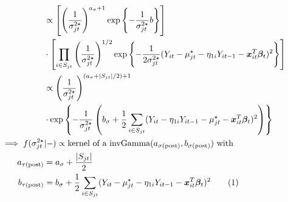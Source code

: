\documentclass[12pt,	%
	a4paper,		%
	twoside,		%
	openright,		%
	titlepage,%
	]{book}
\theoremstyle{definition}
\begin{document}
\begin{itemize}
\begin{align*}
& \propto \left[ \left( \frac{1}{\sigma^{2\star}_{jt}}\right)^{a_\sigma+1} \expp{-\frac{1}{\sigma^{2\star}_{jt}}b} \right] \\ & \cdot\left[  \prod_{i \in S_{jt}} 
\left( \frac{1}{\sigma^{2\star}_{jt}}\right)^{1/2} \expp{-\frac{1}{2\sigma^{2\star}_{jt}}(Y_{it}-\mu^\star_{jt}-\eta_{1i}Y_{it-1}-\vec{x}_{it}^T\vec{\beta}_t)^2} \right]\\
& \propto \left( \frac{1}{\sigma^{2\star}_{jt}}\right)^{(a_\sigma + |S_{jt}|/2)+1} \\ &\cdot \expp{-\frac{1}{\sigma^{2\star}_{jt}}\left( b_\sigma + \frac{1}{2}\sum_{i \in S_{jt}}(Y_{it}-\eta_{1i}Y_{it-1}-\mu^\star_{jt}-\vec{x}_{it}^T\vec{\beta}_t)^2 \right)}\\ 
%
 \implies f(\sigma^{2\star}_{jt}&|-) \propto \text{kernel of a $\invgamma(a_{\postp{\sigma}}, b_{\postp{\sigma}})$ with}\\
a_{\postp{\tau}}&= a_\sigma + \frac{|S_{jt}|}{2} \\
%
b_{\postp{\tau}}&=b_\sigma + \frac{1}{2}\sum_{i \in S_{jt}}(Y_{it}-\mu^\star_{jt}-\eta_{1i}Y_{it-1}-\vec{x}_{it}^T\vec{\beta}_t)^2 
\tag{\stepcounter{equation}\theequation}
\end{align*}



\end{itemize}
\end{document}
